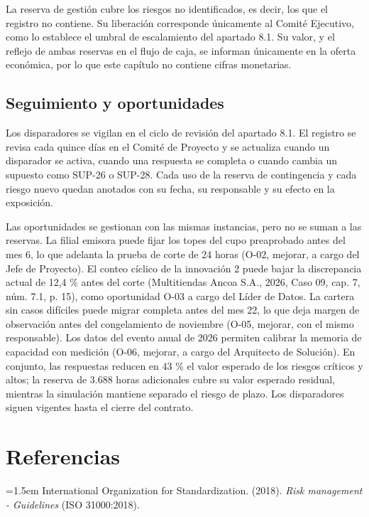 \documentclass[11pt]{article}
\begin{document}
La reserva de gestión cubre los riesgos no identificados, es decir, los que el registro no contiene. Su liberación corresponde únicamente al Comité Ejecutivo, como lo establece el umbral de escalamiento del apartado 8.1. Su valor, y el reflejo de ambas reservas en el flujo de caja, se informan únicamente en la oferta económica, por lo que este capítulo no contiene cifras monetarias.

\subsection{Seguimiento y oportunidades}

Los disparadores se vigilan en el ciclo de revisión del apartado 8.1. El registro se revisa cada quince días en el Comité de Proyecto y se actualiza cuando un disparador se activa, cuando una respuesta se completa o cuando cambia un supuesto como SUP-26 o SUP-28. Cada uso de la reserva de contingencia y cada riesgo nuevo quedan anotados con su fecha, su responsable y su efecto en la exposición.

Las oportunidades se gestionan con las mismas instancias, pero no se suman a las reservas. La filial emisora puede fijar los topes del cupo preaprobado antes del mes 6, lo que adelanta la prueba de corte de 24 horas (O-02, mejorar, a cargo del Jefe de Proyecto). El conteo cíclico de la innovación 2 puede bajar la discrepancia actual de 12,4 \% antes del corte (Multitiendas Ancoa S.A., 2026, Caso 09, cap. 7, núm. 7.1, p. 15), como oportunidad O-03 a cargo del Líder de Datos. La cartera sin casos difíciles puede migrar completa antes del mes 22, lo que deja margen de observación antes del congelamiento de noviembre (O-05, mejorar, con el mismo responsable). Los datos del evento anual de 2026 permiten calibrar la memoria de capacidad con medición (O-06, mejorar, a cargo del Arquitecto de Solución). En conjunto, las respuestas reducen en 43 \% el valor esperado de los riesgos críticos y altos; la reserva de 3.688 horas adicionales cubre su valor esperado residual, mientras la simulación mantiene separado el riesgo de plazo. Los disparadores siguen vigentes hasta el cierre del contrato.

\section*{Referencias}

\noindent\hangindent=1.5em International Organization for Standardization. (2018). \textit{Risk management - Guidelines} (ISO 31000:2018).
\end{document}
